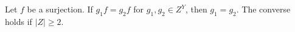 Let $f$ be a surjection. If $g_1 f = g_2 f$ for $g_1, g_2 \in Z^Y$, then $g_1 = g_2$. The converse holds if $|Z| \geq 2$.
